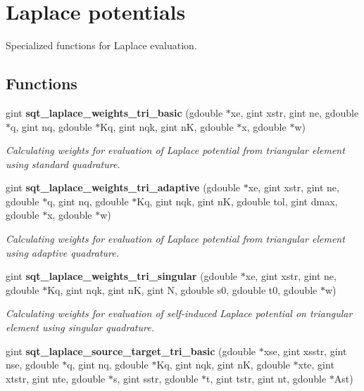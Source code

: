 \section{Laplace potentials}
\label{group__laplace}


Specialized functions for Laplace evaluation.  


\subsection*{Functions}
\begin{DoxyCompactItemize}
\item 
gint {\bf sqt\+\_\+laplace\+\_\+weights\+\_\+tri\+\_\+basic} (gdouble $\ast$xe, gint xstr, gint ne, gdouble $\ast$q, gint nq, gdouble $\ast$Kq, gint nqk, gint n\+K, gdouble $\ast$x, gdouble $\ast$w)
\begin{DoxyCompactList}\small\item\em Calculating weights for evaluation of Laplace potential from triangular element using standard quadrature. \end{DoxyCompactList}\item 
gint {\bf sqt\+\_\+laplace\+\_\+weights\+\_\+tri\+\_\+adaptive} (gdouble $\ast$xe, gint xstr, gint ne, gdouble $\ast$q, gint nq, gdouble $\ast$Kq, gint nqk, gint n\+K, gdouble tol, gint dmax, gdouble $\ast$x, gdouble $\ast$w)
\begin{DoxyCompactList}\small\item\em Calculating weights for evaluation of Laplace potential from triangular element using adaptive quadrature. \end{DoxyCompactList}\item 
gint {\bf sqt\+\_\+laplace\+\_\+weights\+\_\+tri\+\_\+singular} (gdouble $\ast$xe, gint xstr, gint ne, gdouble $\ast$Kq, gint nqk, gint n\+K, gint N, gdouble s0, gdouble t0, gdouble $\ast$w)
\begin{DoxyCompactList}\small\item\em Calculating weights for evaluation of self-\/induced Laplace potential on triangular element using singular quadrature. \end{DoxyCompactList}\item 
gint {\bf sqt\+\_\+laplace\+\_\+source\+\_\+target\+\_\+tri\+\_\+basic} (gdouble $\ast$xse, gint xsstr, gint nse, gdouble $\ast$q, gint nq, gdouble $\ast$Kq, gint nqk, gint n\+K, gdouble $\ast$xte, gint xtstr, gint nte, gdouble $\ast$s, gint sstr, gdouble $\ast$t, gint tstr, gint nt, gdouble $\ast$Ast)

\end{DoxyCompactItemize}
